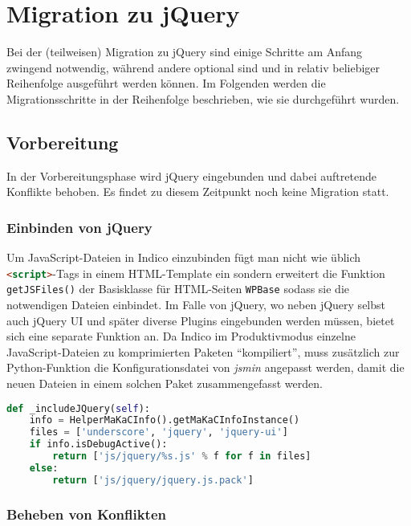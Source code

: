 \chapter{Migration zu jQuery}

Bei der (teilweisen) Migration zu jQuery sind einige Schritte am Anfang zwingend notwendig, während
andere optional sind und in relativ beliebiger Reihenfolge ausgeführt werden können. Im Folgenden
werden die Migrationsschritte in der Reihenfolge beschrieben, wie sie durchgeführt wurden.

\section{Vorbereitung}

In der Vorbereitungsphase wird jQuery eingebunden und dabei auftretende Konflikte behoben. Es findet
zu diesem Zeitpunkt noch keine Migration statt.

\subsection{Einbinden von jQuery}

Um JavaScript-Dateien in Indico einzubinden fügt man nicht wie üblich
\lstinline[language=HTML]{<script>}-Tags in einem HTML-Template ein sondern erweitert die Funktion
\lstinline{getJSFiles()} der Basisklasse für HTML-Seiten \lstinline{WPBase} sodass sie die
notwendigen Dateien einbindet. Im Falle von jQuery, wo neben jQuery selbst auch jQuery UI und später
diverse Plugins eingebunden werden müssen, bietet sich eine separate Funktion an. Da Indico im
Produktivmodus einzelne JavaScript-Dateien zu komprimierten Paketen \enquote{kompiliert}, muss
zusätzlich zur Python-Funktion die Konfigurationsdatei von \emph{jsmin} angepasst werden, damit die
neuen Dateien in einem solchen Paket zusammengefasst werden.

\begin{lstlisting}[language=Python,caption=Einbinden von jQuery und Underscore.js in Indico]
def _includeJQuery(self):
    info = HelperMaKaCInfo().getMaKaCInfoInstance()
    files = ['underscore', 'jquery', 'jquery-ui']
    if info.isDebugActive():
        return ['js/jquery/%s.js' % f for f in files]
    else:
        return ['js/jquery/jquery.js.pack']
\end{lstlisting}

\subsection{Beheben von Konflikten}

